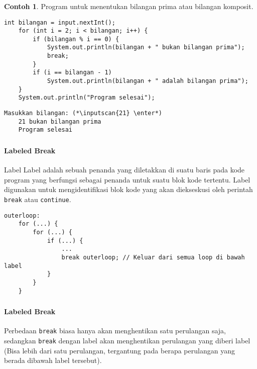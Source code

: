 \documentclass[aspectratio=169]{beamer}
\theoremstyle{definition}
\newtheorem*{contoh}{Contoh}
\newcommand{\enter}{\raisebox{-1.8pt}{\begin{tikzpicture}[scale=0.3]
    \draw[thin,fill=gray] (0,0) rectangle (2,1);
    \draw (0.3,0.3) -- (0.7,0.3)--(0.7,0.6);     
\end{tikzpicture}}}
\newcommand{\inputscan}[1]{\raisebox{0pt}[1pt]{\colorbox{darkgray}{#1}}}
\begin{document}
    \begin{frame}[fragile]
        \frametitle{\insertsection}
        \begin{contoh}
            Program untuk menentukan bilangan prima atau bilangan komposit.
        \end{contoh}
        \begin{lstlisting}[firstnumber=3]
    int bilangan = input.nextInt();
    for (int i = 2; i < bilangan; i++) {
        if (bilangan % i == 0) {
            System.out.println(bilangan + " bukan bilangan prima");
            break;
        }
        if (i == bilangan - 1)
            System.out.println(bilangan + " adalah bilangan prima");
    }
    System.out.println("Program selesai");
        \end{lstlisting}
        \begin{lstlisting}[style=output]
    Masukkan bilangan: (*\inputscan{21} \enter*)
    21 bukan bilangan prima
    Program selesai
        \end{lstlisting}
    \end{frame}

    \begin{frame}[fragile]
        \frametitle{\insertsection}
        \framesubtitle{Labeled Break}
        \begin{block}{Label}
            Label adalah sebuah penanda yang diletakkan di suatu baris pada kode program yang berfungsi sebagai penanda untuk suatu blok kode tertentu. Label digunakan untuk mengidentifikasi blok kode yang akan diekseskusi oleh perintah \texttt{break} atau \texttt{continue}.
        \end{block}
        \begin{lstlisting}[style=standard,firstnumber=9,caption={Labeled Break}]
    outerloop:
    for (...) {
        for (...) {
            if (...) {
                ...
                break outerloop; // Keluar dari semua loop di bawah label
            }
        }
    }
        \end{lstlisting}
    \end{frame}

    \begin{frame}
        \frametitle{\insertsection}
        \framesubtitle{Labeled Break}
        \begin{alertblock}{Perbedaan}
            \texttt{break} biasa hanya akan menghentikan satu perulangan saja, sedangkan \texttt{break} dengan label akan menghentikan perulangan yang diberi label (Bisa lebih dari satu perulangan, tergantung pada berapa perulangan yang berada dibawah label tersebut).
        \end{alertblock}
    \end{frame}
\end{document}
